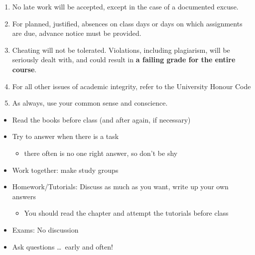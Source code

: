 \documentclass[headrule,footrule]{foils}
\begin{document}
\begin{enumerate}
\item No late work will be accepted, except in the case of a documented excuse.
\item For planned, justified, absences on class days or days on which assignments are due, advance notice must be provided.
\item Cheating will not be tolerated. Violations, including plagiarism, will be seriously dealt with, and could result in \textbf{a failing grade for the entire course}.
\item For all other issues of academic integrity, refer to the University Honour Code 
\item As always, use your common sense and conscience.
\end{enumerate}



\begin{itemize}
\item Read the books before class (and after again, if necessary)
\item Try to answer when there is a task\task
  \begin{itemize}
  \item there often is no one right answer, so don't be shy
  \end{itemize}
\item Work together: make study groups
\item Homework/Tutorials: Discuss as much as you want, write up your own answers
  \begin{itemize}
  \item You should read the chapter and attempt the tutorials before class
  \end{itemize}
\item Exams: No discussion
\item Ask questions \ldots\   early and often!
\end{itemize}

\end{document}
